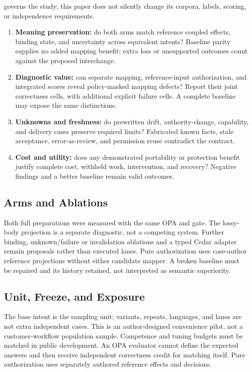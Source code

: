 \documentclass[11pt,letterpaper]{article}
\newcommand{\code}[1]{\texttt{\detokenize{#1}}}
\begin{document}
\code{PROTOCOL.md} governs the study; this paper does not silently change its
corpora, labels, scoring, or independence requirements.

\begin{enumerate}
\item \textbf{Meaning preservation:} do both arms match reference coupled
effects, binding state, and uncertainty across equivalent intents? Baseline
parity supplies no added mapping benefit; extra loss or unsupported outcomes
count against the proposed interchange.
\item \textbf{Diagnostic value:} can separate mapping, reference-input
authorization, and integrated scores reveal policy-masked mapping defects?
Report their joint correctness cells, with additional explicit failure cells.
A complete baseline may expose the same distinctions.
\item \textbf{Unknowns and freshness:} do prewritten drift, authority-change,
capability, and delivery cases preserve required limits? Fabricated known facts,
stale acceptance, error-as-review, and permission reuse contradict the contract.
\item \textbf{Cost and utility:} does any demonstrated portability or protection
benefit justify complete cost, withheld work, intervention, and recovery?
Negative findings and a better baseline remain valid outcomes.
\end{enumerate}

\subsection{Arms and Ablations}

Both full preparations were measured with the same OPA and gate. The lossy-body
projection is a separate diagnostic, not a competing system. Further binding,
unknown/failure or invalidation ablations and a typed Cedar adapter remain
proposals rather than executed lanes. Pure authorization uses case-author
reference projections without either candidate mapper. A broken baseline must
be repaired and its history retained, not interpreted as semantic superiority.

\subsection{Unit, Freeze, and Exposure}

The base intent is the sampling unit; variants, repeats, languages, and lanes
are not extra independent cases. This is an author-designed convenience pilot,
not a customer-workflow population sample. Competence and tuning budgets must
be matched in public development. An OPA evaluator cannot define the expected
answers and then receive independent correctness credit for matching itself.
Pure authorization uses separately authored reference effects and decisions.
\end{document}
